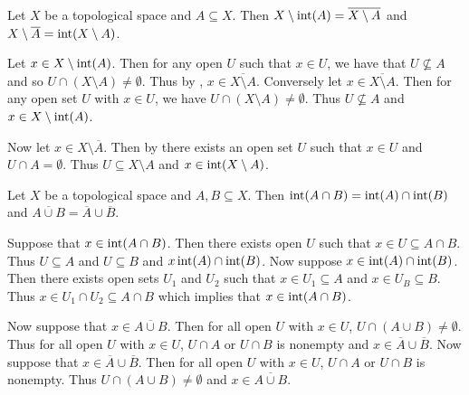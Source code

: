 \documentclass[letterpaper, 11pt]{article}
\begin{document}
\begin{prop}
  Let $X$ be a topological space and $A \subseteq X$.
  Then $X \setminus \operatorname{int}(A) = \overline{X \setminus A}$ and $X \setminus \overline{A} = \operatorname{int}(X \setminus A)$.
\end{prop}
\begin{pf}
  Let $x \in X \setminus \operatorname{int}(A)$.
  Then for any open $U$ such that $x \in U$, we have that $U \not\subseteq A$ and so $U \cap (X \setminus A) \neq \emptyset$.
  Thus by , $x \in \overline{X \setminus A}$.
  Conversely let $x \in \overline{X \setminus A}$.
  Then for any open set $U$ with $x \in U$, we have $U \cap (X \setminus A) \neq \emptyset$.
  Thus $U \not\subseteq A$ and $x \in X \setminus \operatorname{int}(A)$.

  Now let $x \in X \setminus \overline{A}$.
  Then by  there exists an open set $U$ such that $x \in U$ and $U \cap A = \emptyset$.
  Thus $U \subseteq X \setminus A$ and $x \in \operatorname{int}(X \setminus A)$.
\end{pf}

\begin{prop}
  Let $X$ be a topological space and $A, B \subseteq X$.
  Then $\operatorname{int}(A \cap B) = \operatorname{int}(A) \cap \operatorname{int}(B)$ and $\overline{A \cup B} = \overline{A} \cup \overline{B}$.
\end{prop}
\begin{pf}
  Suppose that $x \in \operatorname{int}(A \cap B)$.
  Then there exists open $U$ such that $x \in U \subseteq A \cap B$.
  Thus $U \subseteq A$ and $U \subseteq B$ and $x \operatorname{int}(A) \cap \operatorname{int}(B)$.
  Now suppose $x \in \operatorname{int}(A) \cap \operatorname{int}(B)$. Then there exists open sets $U_{1}$ and $U_{2}$ such that $x \in U_{1} \subseteq A$ and $x \in U_{B} \subseteq B$.
  Thus $x \in U_{1} \cap U_{2} \subseteq A \cap B$ which implies that $x \in \operatorname{int}(A \cap B)$.

  Now suppose that $x \in \overline{A \cup B}$.
  Then for all open $U$ with $x \in U$, $U \cap (A \cup B) \neq \emptyset$.
  Thus for all open $U$ with $x \in U$, $U \cap A$ or $U \cap B$ is nonempty and $x \in \overline{A} \cup \overline{B}$.
  Now suppose that $x \in \overline{A} \cup \overline{B}$.
  Then for all open $U$ with $x \in U$, $U \cap A$ or $U \cap B$  is nonempty.
  Thus $U \cap (A \cup B) \neq \emptyset$ and $x \in \overline{A \cup B}$.
\end{pf}

\clearpage
\end{document}

